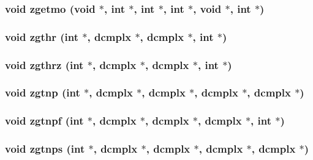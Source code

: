\subsubsection{\setlength{\rightskip}{0pt plus 5cm}void zgetmo (void $\ast$, int $\ast$, int $\ast$, int $\ast$, void $\ast$, int $\ast$)}\label{essl_8h_deb6a4d2b246d5f8155e9e3995b334dd}


\subsubsection{\setlength{\rightskip}{0pt plus 5cm}void zgthr (int $\ast$, {\bf dcmplx} $\ast$, {\bf dcmplx} $\ast$, int $\ast$)}\label{essl_8h_cb3e85b3a41cbc12b782e5a9b7df31d5}


\subsubsection{\setlength{\rightskip}{0pt plus 5cm}void zgthrz (int $\ast$, {\bf dcmplx} $\ast$, {\bf dcmplx} $\ast$, int $\ast$)}\label{essl_8h_fc7b2fe6aa7cece40065071ed8457054}


\subsubsection{\setlength{\rightskip}{0pt plus 5cm}void zgtnp (int $\ast$, {\bf dcmplx} $\ast$, {\bf dcmplx} $\ast$, {\bf dcmplx} $\ast$, {\bf dcmplx} $\ast$)}\label{essl_8h_a61b5ee963b4c9e00441476392fd9665}


\subsubsection{\setlength{\rightskip}{0pt plus 5cm}void zgtnpf (int $\ast$, {\bf dcmplx} $\ast$, {\bf dcmplx} $\ast$, {\bf dcmplx} $\ast$, int $\ast$)}\label{essl_8h_da6e9144ed619e414d0d4356457f1da9}


\subsubsection{\setlength{\rightskip}{0pt plus 5cm}void zgtnps (int $\ast$, {\bf dcmplx} $\ast$, {\bf dcmplx} $\ast$, {\bf dcmplx} $\ast$, {\bf dcmplx} $\ast$)}\label{essl_8h_92795e6a60596e21c7dad9aa95e3d7da}


